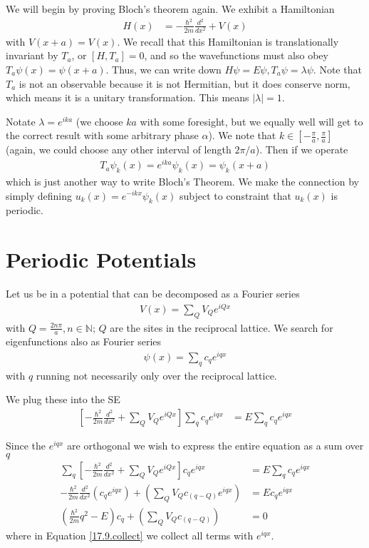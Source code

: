 \documentclass[10pt]{report}
\newcommand{\abs}[1]{\left|#1\right|}
\newcommand{\rtd}[2]{\frac{d^2#1}{d#2^2}}
\begin{document}
We will begin by proving Bloch's theorem again. We exhibit a Hamiltonian
\begin{align}
    H(x) &= -\frac{\hbar^2}{2m}\rtd{}{x} + V(x)
\end{align}
with $V(x + a) = V(x)$. We recall that this Hamiltonian is translationally invariant by $T_a$, or $\left[ H, T_a \right] = 0$, and so the wavefunctions must also obey $T_a\psi(x) = \psi(x+a)$. Thus, we can write down $H\psi = E\psi, T_a\psi = \lambda\psi$. Note that $T_a$ is not an observable because it is not Hermitian, but it does conserve norm, which means it is a unitary transformation. This means $\abs{\lambda} = 1$.

Notate $\lambda = e^{ika}$ (we choose $ka$ with some foresight, but we equally well will get to the correct result with some arbitrary phase $\alpha$). We note that $k \in \left[ -\frac{\pi}{a}, \frac{\pi}{a} \right]$ (again, we could choose any other interval of length $2\pi/a$). Then if we operate
\begin{align}
    T_a\psi_k(x) = e^{ika}\psi_k(x) = \psi_k(x+a)
\end{align}
which is just another way to write Bloch's Theorem. We make the connection by simply defining $u_k(x) = e^{-ikx}\psi_k(x)$ subject to constraint that $u_k(x)$ is periodic.

\section{Periodic Potentials}

Let us be in a potential that can be decomposed as a Fourier series 
\begin{align}
    V(x) = \sum\limits_{Q}^{}V_Qe^{iQx}
\end{align}
with $Q = \frac{2n\pi}{a}, n \in \mathbb{N}$; $Q$ are the sites in the reciprocal lattice. We search for eigenfunctions also as Fourier series 
\begin{align}
    \psi(x) = \sum\limits_{q}^{}c_qe^{iqx}
\end{align}
with $q$ running not necessarily only over the reciprocal lattice.

We plug these into the SE
\begin{align}
    \left[-\frac{\hbar^2}{2m}\rtd{}{x} + \sum\limits_{Q}^{}V_Qe^{iQx}\right]\sum\limits_{q}^{}c_qe^{iqx} &= E\sum\limits_{q}^{}c_qe^{iqx}
\end{align}

Since the $e^{iqx}$ are orthogonal we wish to express the entire equation as a sum over $q$
\begin{align}
    \sum\limits_{q}^{}\left[-\frac{\hbar^2}{2m}\rtd{}{x} + \sum\limits_{Q}^{}V_Qe^{iQx}\right]c_qe^{iqx} &= E\sum\limits_{q}^{}c_qe^{iqx}\\
    -\frac{\hbar^2}{2m}\rtd{}{x}\left( c_qe^{iqx} \right) + \left(\sum\limits_{Q}^{}V_Qc_{(q-Q)}e^{iqx}\right) &= Ec_qe^{iqx}\label{17.9.collect}\\
    \left(\frac{\hbar^2}{2m}q^2 - E\right)c_q + \left(\sum\limits_{Q}^{}V_Qc_{(q-Q)}\right) &= 0\label{17.9.newSE}
\end{align}
where in Equation \eqref{17.9.collect} we collect all terms with $e^{iqx}$. 
\end{document}
